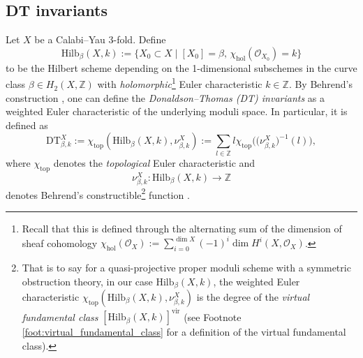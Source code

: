 \documentclass[11pt,colorinlistoftodos]{amsart}
\numberwithin{equation}{subsection}
\theoremstyle{plain}
\theoremstyle{definition}
\theoremstyle{remark}
\newcommand{\Z}{\mathbb{Z}}
\begin{document}
\subsection{DT invariants} 
Let $X$ be a Calabi--Yau 3-fold. Define
\[
\mathrm{Hilb}_\beta(X,k):=\{X_0\subset X\mid [X_0]=\beta,\, \chi_\mathrm{hol}(\mathcal{O}_{X_0})=k\}
\]
to be the Hilbert scheme depending on the 1-dimensional subschemes in the curve class $\beta\in H_2(X,\mathbb{Z})$ with \emph{holomorphic}\footnote{Recall that this is defined through the alternating sum of the dimension of sheaf cohomology $\chi_\mathrm{hol}(\mathcal{O}_X):=\sum_{i=0}^{\dim X}(-1)^i\dim H^i(X,\mathcal{O}_X)$.} Euler characteristic $k\in\mathbb{Z}$. By Behrend's construction \cite{Behrend2009}, one can define the \emph{Donaldson--Thomas (DT) invariants} as a weighted Euler characteristic of the underlying moduli space. In particular, it is defined as
\begin{equation}
\label{eq:DT_invariants}
\mathrm{DT}_{\beta,k}^X:=\chi_\mathrm{top}\left(\mathrm{Hilb}_{\beta}(X,k),\nu^X_{\beta,k}\right):=\sum_{l\in\Z}l\chi_\mathrm{top}\big(\big(\nu_{\beta,k}^X\big)^{-1}(l)\big),
\end{equation}
where $\chi_\mathrm{top}$ denotes the \emph{topological} Euler characteristic and 
\begin{equation}
\label{eq:Behrend_function}
\nu_{\beta,k}^X\colon \mathrm{Hilb}_{\beta}(X,k)\to \Z
\end{equation}
denotes Behrend's constructible\footnote{That is to say for a quasi-projective proper moduli scheme with a symmetric obstruction theory, in our case $\mathrm{Hilb}_{\beta}(X,k)$, the weighted Euler characteristic $\chi_\mathrm{top}(\mathrm{Hilb}_{\beta}(X,k),\nu_{\beta,k}^X)$ is the degree of the \emph{virtual fundamental class} $\left[\mathrm{Hilb}_{\beta}(X,k)\right]^{\mathrm{vir}}$ (see Footnote \ref{foot:virtual_fundamental_class} for a definition of the virtual fundamental class).} function \cite{Behrend2009}. 
\end{document}
